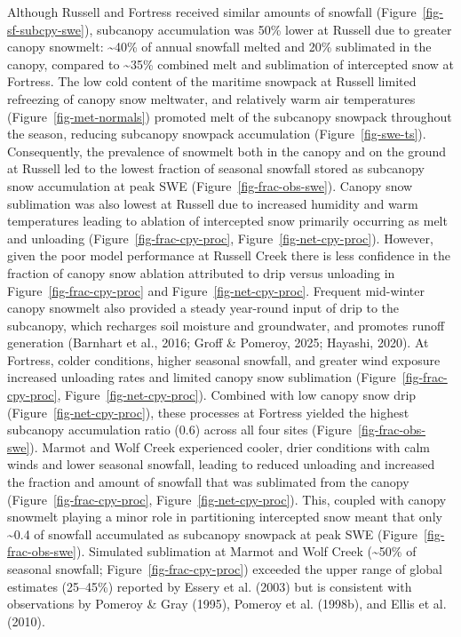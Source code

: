 \documentclass[
  letterpaper,
]{tex/uofsthesis-cs}
\begin{document}
Although Russell and Fortress received similar amounts of snowfall
(Figure~\ref{fig-sf-subcpy-swe}), subcanopy accumulation was 50\% lower
at Russell due to greater canopy snowmelt: \textasciitilde40\% of annual
snowfall melted and 20\% sublimated in the canopy, compared to
\textasciitilde35\% combined melt and sublimation of intercepted snow at
Fortress. The low cold content of the maritime snowpack at Russell
limited refreezing of canopy snow meltwater, and relatively warm air
temperatures (Figure~\ref{fig-met-normals}) promoted melt of the
subcanopy snowpack throughout the season, reducing subcanopy snowpack
accumulation (Figure~\ref{fig-swe-ts}). Consequently, the prevalence of
snowmelt both in the canopy and on the ground at Russell led to the
lowest fraction of seasonal snowfall stored as subcanopy snow
accumulation at peak SWE (Figure~\ref{fig-frac-obs-swe}). Canopy snow
sublimation was also lowest at Russell due to increased humidity and
warm temperatures leading to ablation of intercepted snow primarily
occurring as melt and unloading (Figure~\ref{fig-frac-cpy-proc},
Figure~\ref{fig-net-cpy-proc}). However, given the poor model
performance at Russell Creek there is less confidence in the fraction of
canopy snow ablation attributed to drip versus unloading in
Figure~\ref{fig-frac-cpy-proc} and Figure~\ref{fig-net-cpy-proc}.
Frequent mid-winter canopy snowmelt also provided a steady year-round
input of drip to the subcanopy, which recharges soil moisture and
groundwater, and promotes runoff generation (Barnhart et al., 2016;
Groff \& Pomeroy, 2025; Hayashi, 2020). At Fortress, colder conditions,
higher seasonal snowfall, and greater wind exposure increased unloading
rates and limited canopy snow sublimation
(Figure~\ref{fig-frac-cpy-proc}, Figure~\ref{fig-net-cpy-proc}).
Combined with low canopy snow drip (Figure~\ref{fig-net-cpy-proc}),
these processes at Fortress yielded the highest subcanopy accumulation
ratio (0.6) across all four sites (Figure~\ref{fig-frac-obs-swe}).
Marmot and Wolf Creek experienced cooler, drier conditions with calm
winds and lower seasonal snowfall, leading to reduced unloading and
increased the fraction and amount of snowfall that was sublimated from
the canopy (Figure~\ref{fig-frac-cpy-proc},
Figure~\ref{fig-net-cpy-proc}). This, coupled with canopy snowmelt
playing a minor role in partitioning intercepted snow meant that only
\textasciitilde0.4 of snowfall accumulated as subcanopy snowpack at peak
SWE (Figure~\ref{fig-frac-obs-swe}). Simulated sublimation at Marmot and
Wolf Creek (\textasciitilde50\% of seasonal snowfall;
Figure~\ref{fig-frac-cpy-proc}) exceeded the upper range of global
estimates (25--45\%) reported by Essery et al. (2003) but is consistent
with observations by Pomeroy \& Gray (1995), Pomeroy et al. (1998b), and
Ellis et al. (2010).
\end{document}

